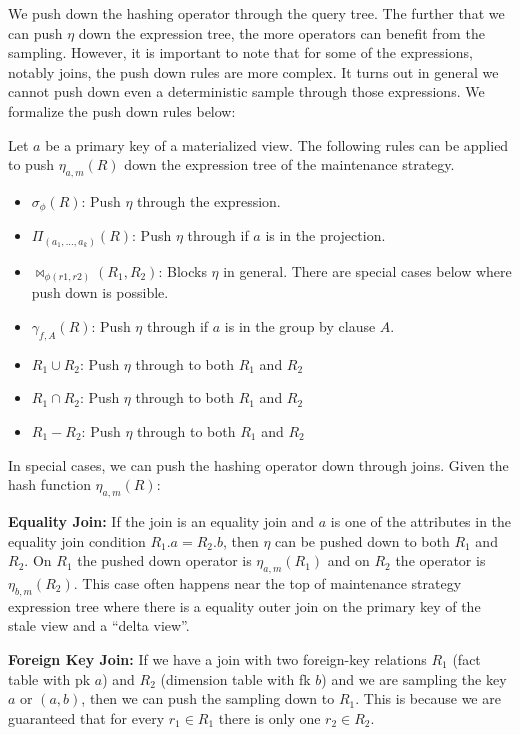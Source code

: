 We push down the hashing operator through the query tree.
The further that we can push $\eta$ down the expression tree, the more operators can benefit from the sampling.
However, it is important to note that for some of the expressions, notably joins, the push down rules are more complex. 
It turns out in general we cannot push down even a deterministic sample through those expressions.
We formalize the push down rules below:
\begin{definition}
Let $a$ be a primary key of a materialized view. The following rules can be applied to push $\eta_{a, m}(R)$ down the expression tree of the maintenance strategy. 
\begin{itemize}[noitemsep]
\item $\sigma_{\phi}(R)$: Push $\eta$ through the expression.  
\item $\Pi_{(a_1,...,a_k)}(R)$: Push $\eta $ through if $a$ is in the projection.
\item $\bowtie_{\phi (r1,r2)}(R_1,R_2)$: Blocks $\eta $ in general. There are special cases below where push down is possible.
\item $\gamma_{f,A}(R)$: Push $\eta $ through if $a$ is in the group by clause $A$.
\item $R_1 \cup R_2$: Push $\eta $ through to both $R_1$ and $R_2$
\item $R_1 \cap R_2$: Push $\eta $ through to both $R_1$ and $R_2$
\item $R_1 - R_2$: Push $\eta $ through to both $R_1$ and $R_2$
\end{itemize}
\end{definition}
In special cases, we can push the hashing operator down through joins. 
Given the hash function $\eta_{a, m}(R)$:
\vspace{.25em}

{\noindent \textbf{Equality Join:}} If the join is an equality join and $a$ is one of the attributes in the equality join condition $R_1.a = R_2.b$, then $\eta$ can be pushed down to both $R_1$ and $R_2$. On $R_1$ the pushed down operator is $\eta_{a, m}(R_1)$ and on $R_2$ the operator is $\eta_{b, m}(R_2)$. This case often happens near the top of maintenance strategy expression tree where there is a equality outer join on the primary key of the stale view and a ``delta view''.

\vspace{.25em}

{\noindent \textbf{Foreign Key Join:}} If we have a join with two foreign-key relations $R_1$ (fact table with pk $a$) and $R_2$ (dimension table with fk $b$) and we are sampling the key $a$ or $(a,b)$, then we can push the sampling down to $R_1$. This is because we are guaranteed that for every $r_1\in R_1$ there is only one $r_2 \in R_2$.

